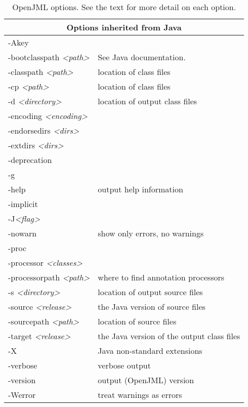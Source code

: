 \documentclass{report}%
\begin{document}
\begin{table}
{\begin{tabular}{|l|p{1.4in}|}
\hline
\multicolumn{2}{|c|}{Options inherited from Java} \\
\hline
-Akey & \\ \hline
-bootclasspath {\it <path>}& See Java documentation. \\ \hline
-classpath {\it <path>}& location of class files \\ \hline
-cp {\it <path>}& location of class files\\ \hline
-d {\it <directory>} & location of output class files\\ \hline
-encoding {\it <encoding>} & \\ \hline
-endorsedirs {\it <dirs>} & \\ \hline
-extdirs {\it <dirs>} & \\ \hline
-deprecation & \\ \hline
-g & \\ \hline
-help & output help information\\ \hline
-implicit & \\ \hline
-J{\it <flag>} & \\ \hline
-nowarn & show only errors, no warnings \\ \hline
-proc & \\ \hline
-processor {\it <classes>} & \\ \hline
-processorpath {\it <path>} & where to find annotation processors\\ \hline
-s {\it <directory>} & location of output source files\\ \hline
-source {\it <release>} & the Java version of source files\\ \hline
-sourcepath {\it <path>} & location of source files\\ \hline
-target {\it <release>} & the Java version of the output class files\\ \hline
-X & Java non-standard extensions\\ \hline
-verbose & verbose output \\ \hline
-version & output (OpenJML) version\\ \hline
-Werror & treat warnings as errors \\ \hline

\end{tabular}
}
\caption{OpenJML options. See the text for more detail on each option.}
\label{Tab:Options}
\end{table}
\end{document}
